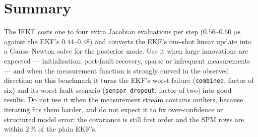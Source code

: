 \section{Summary}
The IEKF costs one to four extra Jacobian evaluations per step
($0.56$--$0.60\,\SI{}{\micro\second}$ against the EKF's $0.44$--$0.48$) and converts the EKF's
one-shot linear update into a Gauss--Newton solve for the posterior mode. Use it when large
innovations are expected --- initialisation, post-fault recovery, sparse or infrequent
measurements --- and when the measurement function is strongly curved in the observed
direction; on this benchmark it turns the EKF's worst failure (\texttt{combined}, factor of
six) and its worst fault scenario (\texttt{sensor\_dropout}, factor of two) into good results.
Do not use it when the measurement stream contains outliers, because iterating fits them
harder, and do not expect it to fix over-confidence or structured model error: the covariance
is still first order and the SPM rows are within $2\,\%$ of the plain EKF's.
